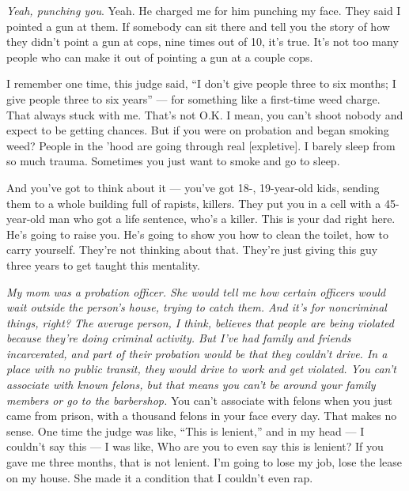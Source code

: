 \emph{Yeah, punching you}. Yeah. He charged me for him punching my face.
They said I pointed a gun at them. If somebody can sit there and tell
you the story of how they didn't point a gun at cops, nine times out of
10, it's true. It's not too many people who can make it out of pointing
a gun at a couple cops.

I remember one time, this judge said, ``I don't give people three to six
months; I give people three to six years'' --- for something like a
first-time weed charge. That always stuck with me. That's not O.K. I
mean, you can't shoot nobody and expect to be getting chances. But if
you were on probation and began smoking weed? People in the 'hood are
going through real {[}expletive{]}. I barely sleep from so much trauma.
Sometimes you just want to smoke and go to sleep.

And you've got to think about it --- you've got 18-, 19-year-old kids,
sending them to a whole building full of rapists, killers. They put you
in a cell with a 45-year-old man who got a life sentence, who's a
killer. This is your dad right here. He's going to raise you. He's going
to show you how to clean the toilet, how to carry yourself. They're not
thinking about that. They're just giving this guy three years to get
taught this mentality.

\emph{My mom was a probation officer. She would tell me how certain
officers would wait outside the person's house, trying to catch them.
And it's for noncriminal things, right? The average person, I think,
believes that people are being violated because they're doing criminal
activity. But I've had family and friends incarcerated, and part of
their probation would be that they couldn't drive. In a place with no
public transit, they would drive to work and get violated. You can't
associate with known felons, but that means you can't be around your
family members or go to the barbershop.} You can't associate with felons
when you just came from prison, with a thousand felons in your face
every day. That makes no sense. One time the judge was like, ``This is
lenient,'' and in my head --- I couldn't say this --- I was like, Who
are you to even say this is lenient? If you gave me three months, that
is not lenient. I'm going to lose my job, lose the lease on my house.
She made it a condition that I couldn't even rap.

